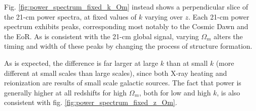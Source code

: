 \documentclass[floats,floatfix,showpacs,amssymb,prd,superscriptaddress,nofootinbib]{revtex4-2} %
\begin{document}
Fig. \ref{fig:power_spectrum_fixed_k_Om} instead shows a perpendicular slice of the 21-cm power spectra, at fixed values of $k$ varying over $z$. Each 21-cm power spectrum exhibits peaks, corresponding most notably to the Cosmic Dawn and the EoR. As is consistent with the 21-cm global signal, varying $\Omega_m$ alters the timing and width of these peaks by changing the process of structure formation.


As is expected, the difference is far larger at large $k$ than at small $k$ (more different at small scales than large scales), since both X-ray heating and reionization are results of small scale galactic sources. The fact that power is generally higher at all redshifts for high $\Omega_m$, both for low and high $k$, is also consistent with fig. \ref{fig:power_spectrum_fixed_z_Om}.



\end{document}
